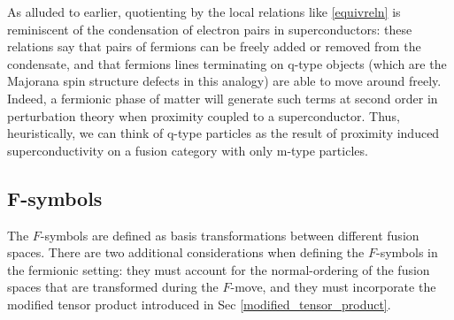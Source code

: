 \documentclass[12pt,a4paper]{article}
\begin{document}
As alluded to earlier, quotienting by the local relations like \eqref{equivreln} is reminiscent of the 
condensation of electron pairs in superconductors: these relations say that pairs of fermions can be freely 
added or removed from the condensate, and that fermions lines terminating on q-type objects (which are 
the Majorana spin structure defects in this analogy) are able to move around freely. 
Indeed, a fermionic phase of matter will generate such terms at second order in perturbation theory when 
proximity coupled to a superconductor.
Thus, heuristically, we can think of q-type particles as the result of proximity induced superconductivity on 
a fusion category with only m-type particles.


\subsection{F-symbols} \label{Fsymbols}

The $F$-symbols are defined as basis transformations between different fusion spaces. 
There are two additional considerations when defining the $F$-symbols in the fermionic setting: they must account for the normal-ordering of the fusion spaces that are transformed during the $F$-move, and they must incorporate the modified tensor product introduced in Sec \ref{modified_tensor_product}. 
\end{document}
